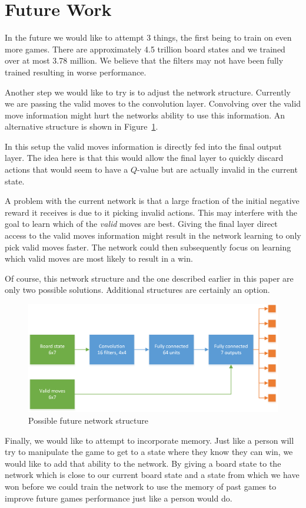 \section{Future Work}
In the future we would like to attempt 3 things, the first being to train on even more games. There are approximately 4.5 trillion board states and we trained over at most 3.78 million. We believe that the filters may not have been fully trained resulting in worse performance. 

Another step we would like to try is to adjust the network structure. Currently we are passing the valid moves to the convolution layer. Convolving over the valid move information might hurt the networks ability to use this information. An alternative structure is shown in Figure~\ref{fig:struct_future}.

In this setup the valid moves information is directly fed into the final output layer. The idea here is that this would allow the final layer to quickly discard actions that would seem to have a $Q$-value but are actually invalid in the current state. 

A problem with the current network is that a large fraction of the initial negative reward it receives is due to it picking invalid actions. This may interfere with the goal to learn which of the \textit{valid} moves are best. Giving the final layer direct access to the valid moves information might result in the network learning to only pick valid moves faster. The network could then subsequently focus on learning which valid moves are most likely to result in a win.

Of course, this network structure and the one described earlier in this paper are only two possible solutions. Additional structures are certainly an option.

\begin{figure}[t]
  \includegraphics[width=\linewidth]{Network2.png}
  \caption{Possible future network structure}
  \label{fig:struct_future}
\end{figure} 

Finally, we would like to attempt to incorporate memory. Just like a person will try to manipulate the game to get to a state where they know they can win, we would like to add that ability to the network. By giving a board state to the network which is close to our current board state and a state from which we have won before we could train the network to use the memory of past games to improve future games performance just like a person would do.